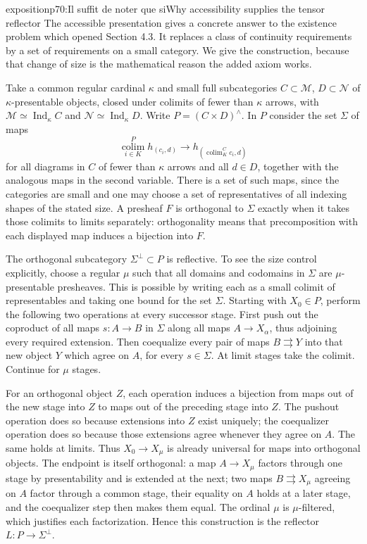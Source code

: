 \begin{dcomment}{exposition}{p70:Il suffit de noter que si}{Why accessibility supplies the tensor reflector}
The accessible presentation gives a concrete answer to the existence problem which opened Section 4.3.  It replaces a class of continuity requirements by a set of requirements on a small category.  We give the construction, because that change of size is the mathematical reason the added axiom works.

Take a common regular cardinal $\kappa$ and small full subcategories $C\subset\mathcal M$, $D\subset\mathcal N$ of $\kappa$-presentable objects, closed under colimits of fewer than $\kappa$ arrows, with $\mathcal M\simeq\operatorname{Ind}_\kappa C$ and $\mathcal N\simeq\operatorname{Ind}_\kappa D$.  Write $P=(C\times D)^\wedge$.  In $P$ consider the set $\Sigma$ of maps
\[
 \operatorname*{colim}_{i\in K}^{P}h_{(c_i,d)}
       \longrightarrow h_{(\operatorname{colim}_K^C c_i,d)}
\]
for all diagrams in $C$ of fewer than $\kappa$ arrows and all $d\in D$, together with the analogous maps in the second variable.  There is a set of such maps, since the categories are small and one may choose a set of representatives of all indexing shapes of the stated size.  A presheaf $F$ is orthogonal to $\Sigma$ exactly when it takes those colimits to limits separately: orthogonality means that precomposition with each displayed map induces a bijection into $F$.

The orthogonal subcategory $\Sigma^\perp\subset P$ is reflective.  To see the size control explicitly, choose a regular $\mu$ such that all domains and codomains in $\Sigma$ are $\mu$-presentable presheaves.  This is possible by writing each as a small colimit of representables and taking one bound for the set $\Sigma$.  Starting with $X_0\in P$, perform the following two operations at every successor stage.  First push out the coproduct of all maps $s:A\to B$ in $\Sigma$ along all maps $A\to X_\alpha$, thus adjoining every required extension.  Then coequalize every pair of maps $B\rightrightarrows Y$ into that new object $Y$ which agree on $A$, for every $s\in\Sigma$.  At limit stages take the colimit.  Continue for $\mu$ stages.

For an orthogonal object $Z$, each operation induces a bijection from maps out of the new stage into $Z$ to maps out of the preceding stage into $Z$.  The pushout operation does so because extensions into $Z$ exist uniquely; the coequalizer operation does so because those extensions agree whenever they agree on $A$.  The same holds at limits.  Thus $X_0\to X_\mu$ is already universal for maps into orthogonal objects.  The endpoint is itself orthogonal: a map $A\to X_\mu$ factors through one stage by presentability and is extended at the next; two maps $B\rightrightarrows X_\mu$ agreeing on $A$ factor through a common stage, their equality on $A$ holds at a later stage, and the coequalizer step then makes them equal.  The ordinal $\mu$ is $\mu$-filtered, which justifies each factorization.  Hence this construction is the reflector $L:P\to\Sigma^\perp$.


\end{dcomment}
